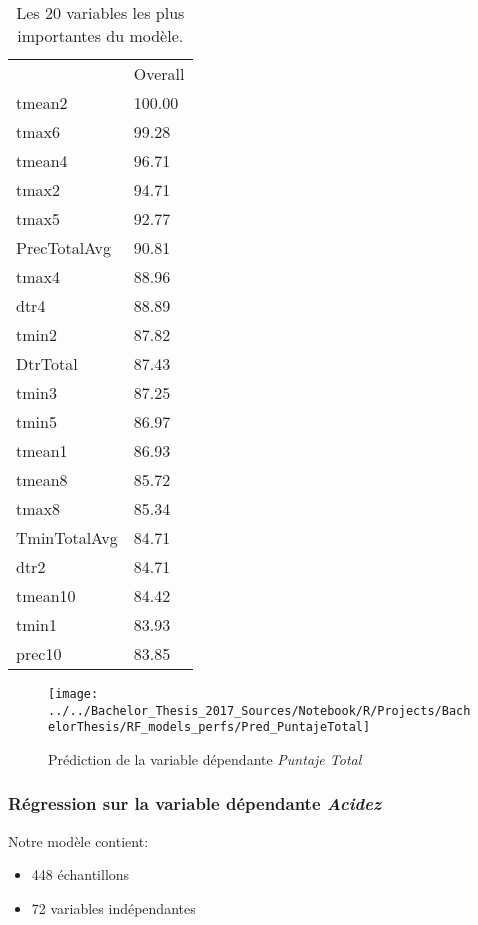 \begin{table}[H]
	\centering
	\caption{Les 20 variables les plus importantes du modèle.}
	\label{RF_Total_Varimp}
	\begin{tabular}{ll}
		& Overall \\
		tmean2       & 100.00  \\
		tmax6        & 99.28   \\
		tmean4       & 96.71   \\
		tmax2        & 94.71   \\
		tmax5        & 92.77   \\
		PrecTotalAvg & 90.81   \\
		tmax4        & 88.96   \\
		dtr4         & 88.89   \\
		tmin2        & 87.82   \\
		DtrTotal     & 87.43   \\
		tmin3        & 87.25   \\
		tmin5        & 86.97   \\
		tmean1       & 86.93   \\
		tmean8       & 85.72   \\
		tmax8        & 85.34   \\
		TminTotalAvg & 84.71   \\
		dtr2         & 84.71   \\
		tmean10      & 84.42   \\
		tmin1        & 83.93   \\
		prec10       & 83.85  
	\end{tabular}
\end{table}



\begin{figure}[H]
	\centering
	\texttt{[image: ../../Bachelor\_Thesis\_2017\_Sources/Notebook/R/Projects/BachelorThesis/RF\_models\_perfs/Pred\_PuntajeTotal]}
	\caption{Prédiction de la variable dépendante \textit{Puntaje Total}}
	\label{fig:predpuntajetotal}
\end{figure}





\newpage
\subsubsection{Régression sur la variable dépendante \textit{Acidez}}
\noindent Notre modèle contient: 
\begin{itemize}
	\item 448 échantillons
	\item 72 variables indépendantes
\end{itemize}


